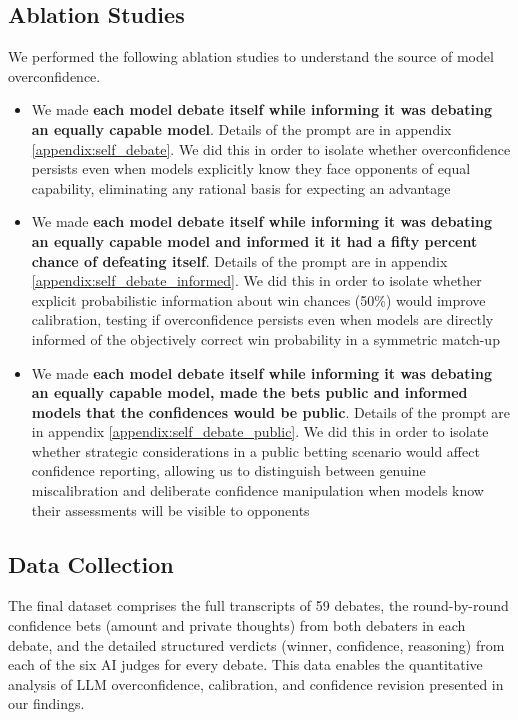 \documentclass{article}
\begin{document}
\subsection{Ablation Studies}
\label{subsec:ablation_studies}

We performed the following ablation studies to understand the source of model overconfidence.

\begin{itemize}
  \item We made \textbf{each model debate itself while informing it was debating an equally capable model}. Details of the prompt are in appendix \ref{appendix:self_debate}. We did this in order to isolate whether overconfidence persists even when models explicitly know they face opponents of equal capability, eliminating any rational basis for expecting an advantage
  \item We made \textbf{each model debate itself while informing it was debating an equally capable model and informed it it had a fifty percent chance of defeating itself}. Details of the prompt are in appendix \ref{appendix:self_debate_informed}. We did this in order to isolate whether explicit probabilistic information about win chances (50\%) would improve calibration, testing if overconfidence persists even when models are directly informed of the objectively correct win probability in a symmetric match-up
  \item We made \textbf{each model debate itself while informing it was debating an equally capable model, made the bets public and informed models that the confidences would be public}. Details of the prompt are in appendix \ref{appendix:self_debate_public}. We did this in order to isolate whether strategic considerations in a public betting scenario would affect confidence reporting, allowing us to distinguish between genuine miscalibration and deliberate confidence manipulation when models know their assessments will be visible to opponents
\end{itemize}





\subsection{Data Collection}
\label{subsec:data_collection}
The final dataset comprises the full transcripts of 59 debates, the round-by-round confidence bets (amount and private thoughts) from both debaters in each debate, and the detailed structured verdicts (winner, confidence, reasoning) from each of the six AI judges for every debate. This data enables the quantitative analysis of LLM overconfidence, calibration, and confidence revision presented in our findings.
\end{document}
